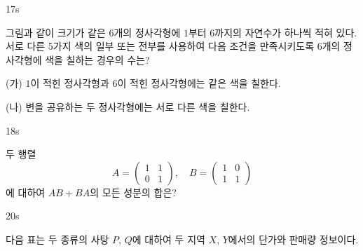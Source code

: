 \documentclass[10pt]{article}
\begin{document}
\setlength{\probboxheight}{100mm}
\begin{pagepair}
\noindent
\begin{minipage}[t][210mm][t]{0.46\linewidth}
\begin{minipage}[t][\probboxheight][t]{\linewidth}
\begin{problem}{17}{s}
\par\smallskip
그림과 같이 크기가 같은 $6$개의 정사각형에 $1$부터 $6$까지의 자연수가 하나씩 적혀 있다. 서로 다른 $5$가지 색의 일부 또는 전부를 사용하여 다음 조건을 만족시키도록 $6$개의 정사각형에 색을 칠하는 경우의 수는? 

\smallskip
\begin{center}
\end{center}

\smallskip
\hspace*{0.5em}(가) $1$이 적힌 정사각형과 $6$이 적힌 정사각형에는 같은 색을 칠한다.

\hspace*{0.5em}(나) 변을 공유하는 두 정사각형에는 서로 다른 색을 칠한다.
\begin{choices}
\end{choices}
\end{problem}
\end{minipage}
\par\vspace{4mm}
\begin{minipage}[t][\probboxheight][t]{\linewidth}
\begin{problem}{18}{s}
\par\smallskip
두 행렬
\[ A = \begin{pmatrix} 1 & 1 \\ 0 & 1 \end{pmatrix}, \quad B = \begin{pmatrix} 1 & 0 \\ 1 & 1 \end{pmatrix} \]
에 대하여 $AB + BA$의 모든 성분의 합은?
\begin{choices}
\end{choices}
\end{problem}
\end{minipage}
\end{minipage}\hfill
\begin{minipage}[t][210mm][t]{0.46\linewidth}
\begin{problem}{20}{s}
\par\smallskip
다음 표는 두 종류의 사탕 $P$, $Q$에 대하여 두 지역 $X$, $Y$에서의 단가와 판매량 정보이다.


\end{problem}
\end{minipage}
\end{pagepair}
\end{document}
